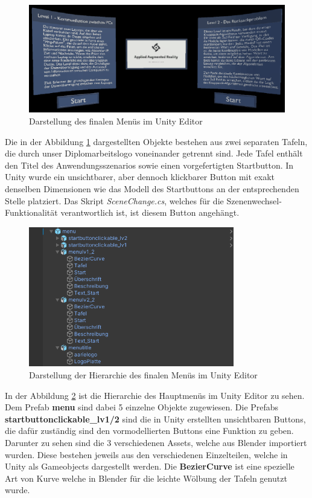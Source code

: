 \begin{figure}[H]
    \centering
    \includegraphics[width=1\textwidth]{images/menuversion2.png}
    \caption{Darstellung des finalen Menüs im Unity Editor}
    \label{fig:menuversion2}
\end{figure}

Die in der Abbildung \ref{fig:menuversion2} dargestellten Objekte bestehen aus zwei separaten Tafeln, die durch unser Diplomarbeitslogo voneinander getrennt sind. Jede Tafel enthält den Titel des Anwendungsszenarios sowie einen vorgefertigten Startbutton.  In Unity wurde ein unsichtbarer, aber dennoch klickbarer Button mit exakt denselben Dimensionen wie das Modell des Startbuttons an der entsprechenden Stelle platziert. Das Skript \textit{SceneChange.cs}, welches für die Szenenwechsel-Funktionalität verantwortlich ist, ist diesem Button angehängt.

\begin{figure}[H]
    \centering
    \includegraphics[width=0.8\textwidth]{images/hierarchiemenuunity.png}
    \caption{Darstellung der Hierarchie des finalen Menüs im Unity Editor}
    \label{fig:hierarchiemenuunity}
\end{figure}

In der Abbildung \ref{fig:hierarchiemenuunity} ist die Hierarchie des Hauptmenüs im Unity Editor zu sehen. Dem Prefab \textbf{menu} sind dabei 5 einzelne Objekte zugewiesen. Die Prefabs \textbf{startbuttonclickable\_lv1/2} sind die in Unity erstellten unsichtbaren Buttons, die dafür zuständig sind den vormodellierten Buttons eine Funktion zu geben. Darunter zu sehen sind die 3 verschiedenen Assets, welche aus Blender importiert wurden. Diese bestehen jeweils aus den verschiedenen Einzelteilen, welche in Unity als Gameobjects dargestellt werden. Die \textbf{BezierCurve} ist eine spezielle Art von Kurve welche in Blender für die leichte Wölbung der Tafeln genutzt wurde.

